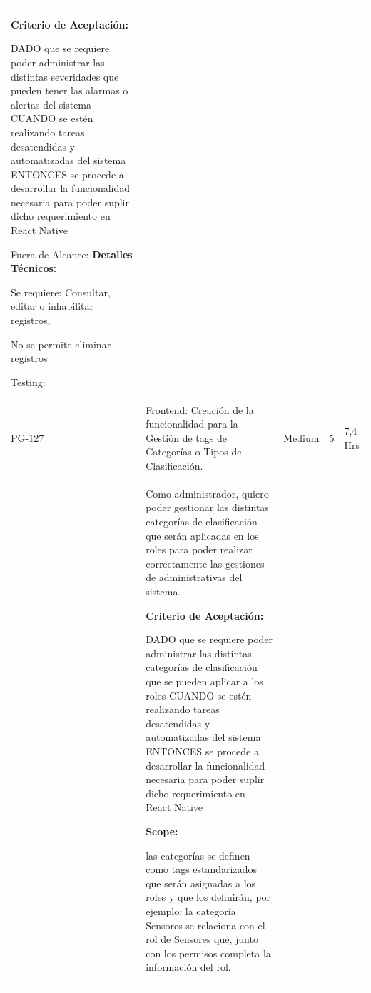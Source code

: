 \documentclass[11pt]{charter}
\begin{document}
\begin{landscape}
\begin{tabularx}{\linewidth}{@{}|p{1.3cm}|p{17cm}|p{1.7cm}|p{1.5cm}|p{1.7cm}|@{}}
\begin{description}
                   \item \textbf{Criterio de Aceptación:}                 
                   \item DADO que se requiere poder administrar las distintas severidades que pueden   tener las alarmas o alertas del sistema CUANDO se estén realizando tareas desatendidas y automatizadas del   sistema ENTONCES se procede a desarrollar la funcionalidad necesaria para poder   suplir dicho requerimiento en React Native             
                   \item Fuera de Alcance:                 
                   \textbf{Detalles Técnicos:} 
                         \item Se requiere: Consultar, editar o inhabilitar registros, 
                         \item No se permite eliminar registros                 
                   \item Testing: 
            \end{description}      &  &     & \\
PG-127   & Frontend: Creación de la   funcionalidad para la Gestión de tags de Categorías o Tipos de Clasificación.                 & Medium             & 5   & 7,4  Hrs          \\
         &  \begin{description}                 
                   \item Como administrador, quiero poder   gestionar las distintas categorías de clasificación que serán aplicadas en los   roles para poder realizar correctamente las gestiones de administrativas del   sistema.                 
                   \item \textbf{Criterio de Aceptación:}                 
                   \item DADO que se requiere poder administrar las distintas categorías de   clasificación que se pueden aplicar a los roles CUANDO se estén realizando tareas desatendidas y automatizadas del   sistema ENTONCES se procede a desarrollar la funcionalidad necesaria para poder   suplir dicho requerimiento en React Native                
                   \item \textbf{Scope:} 
                         \item las categorías se definen como tags estandarizados que serán asignadas a   los roles y que los definirán, por ejemplo: la categoría Sensores se   relaciona con el rol de Sensores que, junto con los permisos completa la   información del rol.                  

\end{description}
\end{tabularx}
\end{landscape}
\end{document}
